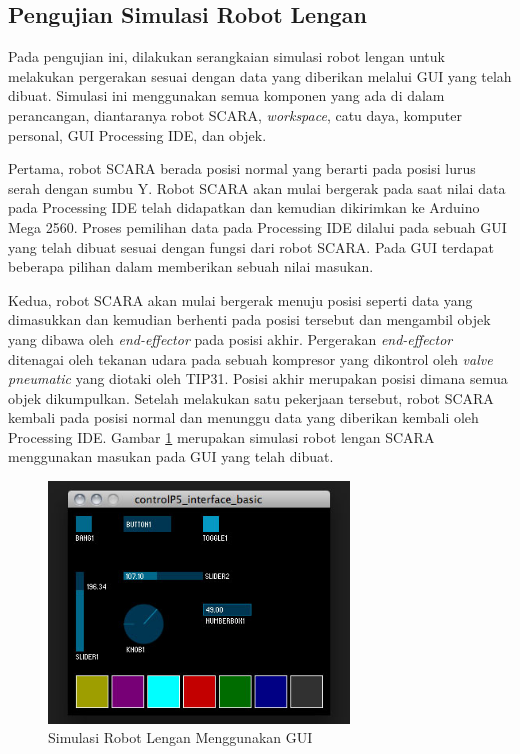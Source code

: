 \subsection{Pengujian Simulasi Robot Lengan}
Pada pengujian ini, dilakukan serangkaian simulasi robot lengan untuk melakukan pergerakan sesuai dengan data yang diberikan melalui GUI yang telah dibuat. Simulasi ini menggunakan semua komponen yang ada di dalam perancangan, diantaranya robot SCARA, \textit{workspace}, catu daya, komputer personal, GUI Processing IDE, dan objek.

Pertama, robot SCARA berada posisi normal yang berarti pada posisi lurus serah dengan sumbu Y. Robot SCARA akan mulai bergerak pada saat nilai data pada Processing IDE telah didapatkan dan kemudian dikirimkan ke Arduino Mega 2560. Proses pemilihan data pada Processing IDE dilalui pada sebuah GUI yang telah dibuat sesuai dengan fungsi dari robot SCARA. Pada GUI terdapat beberapa pilihan dalam memberikan sebuah nilai masukan. 

Kedua, robot SCARA akan mulai bergerak menuju posisi seperti data yang dimasukkan dan kemudian berhenti pada posisi tersebut dan mengambil objek yang dibawa oleh \textit{end-effector} pada posisi akhir.  Pergerakan \textit{end-effector} ditenagai oleh tekanan udara pada sebuah kompresor yang dikontrol oleh\textit{ valve pneumatic} yang diotaki oleh TIP31. Posisi akhir merupakan posisi dimana semua objek dikumpulkan. Setelah melakukan satu pekerjaan tersebut, robot SCARA kembali pada posisi normal dan menunggu data yang diberikan kembali oleh Processing IDE.  Gambar \ref{pic.simulasiakhir} merupakan simulasi robot lengan SCARA menggunakan masukan pada GUI yang telah dibuat.
 \begin{figure}[H]
 	\centering
 	\includegraphics[width=8cm]{gambar/controlp5.jpg}
 	\caption{Simulasi Robot Lengan Menggunakan GUI }
 	\label{pic.simulasiakhir}
 \end{figure}




